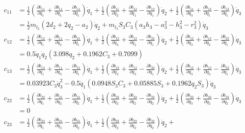 \begin{align*}
c_{11}&=\frac{1}{2}\left(\frac{\partial b_{11}}{\partial q_1}+\frac{\partial b_{11}}{\partial q_1}-\frac{\partial b_{11}}{\partial q_1}\right)\dot q_1+\frac{1}{2}\left(\frac{\partial b_{11}}{\partial q_2}+\frac{\partial b_{12}}{\partial q_1}-\frac{\partial b_{12}}{\partial q_1}\right)\dot q_2+\frac{1}{2}\left(\frac{\partial b_{11}}{\partial q_3}+\frac{\partial b_{13}}{\partial q_1}-\frac{\partial b_{13}}{\partial q_1}\right)\dot q_3\\
&=\frac{1}{2}m_{l_2}(2d_2+2q_2-a_2)\dot q_2+m_{l_3}S_3C_3(a_3h_3-a_3^2-h_3^2-r_3^2)\dot q_3\\
c_{12}&=
\frac{1}{2}\left(\frac{\partial b_{12}}{\partial q_1}+\frac{\partial b_{11}}{\partial q_2}-\frac{\partial b_{21}}{\partial q_1}\right)\dot q_1+
\frac{1}{2}\left(\frac{\partial b_{12}}{\partial q_2}+\frac{\partial b_{12}}{\partial q_2}-\frac{\partial b_{22}}{\partial q_1}\right)\dot q_2+
\frac{1}{2}\left(\frac{\partial b_{12}}{\partial q_3}+\frac{\partial b_{13}}{\partial q_2}-\frac{\partial b_{23}}{\partial q_1}\right)\dot q_3\\
&=0.5\dot q_1\dot q_2(3.098q_2 + 0.1962C_3 + 0.7099)\\
c_{13}&=
\frac{1}{2}\left(\frac{\partial b_{13}}{\partial q_1}+\frac{\partial b_{11}}{\partial q_3}-\frac{\partial b_{31}}{\partial q_1}\right)\dot q_1+
\frac{1}{2}\left(\frac{\partial b_{13}}{\partial q_2}+\frac{\partial b_{12}}{\partial q_3}-\frac{\partial b_{32}}{\partial q_1}\right)\dot q_2+
\frac{1}{2}\left(\frac{\partial b_{13}}{\partial q_3}+\frac{\partial b_{13}}{\partial q_3}-\frac{\partial b_{33}}{\partial q_1}\right)\dot q_3\\
&=0.03923C_3\dot q_3^2 - 0.5\dot q_1(0.0948S_3C_3 + 0.05885S_3 + 0.1962q_2S_3)\dot q_3\\
c_{22}&=
\frac{1}{2}\left(\frac{\partial b_{22}}{\partial q_1}+\frac{\partial b_{21}}{\partial q_2}-\frac{\partial b_{21}}{\partial q_2}\right)\dot q_1+
\frac{1}{2}\left(\frac{\partial b_{22}}{\partial q_2}+\frac{\partial b_{22}}{\partial q_2}-\frac{\partial b_{22}}{\partial q_2}\right)\dot q_2+
\frac{1}{2}\left(\frac{\partial b_{22}}{\partial q_3}+\frac{\partial b_{23}}{\partial q_2}-\frac{\partial b_{23}}{\partial q_2}\right)\dot q_3\\
&=0\\
c_{23}&=
\frac{1}{2}\left(\frac{\partial b_{23}}{\partial q_1}+\frac{\partial b_{21}}{\partial q_3}-\frac{\partial b_{31}}{\partial q_2}\right)\dot q_1+
\frac{1}{2}\left(\frac{\partial b_{23}}{\partial q_2}+\frac{\partial b_{22}}{\partial q_3}-\frac{\partial b_{32}}{\partial q_2}\right)\dot q_2+

\end{align*}
